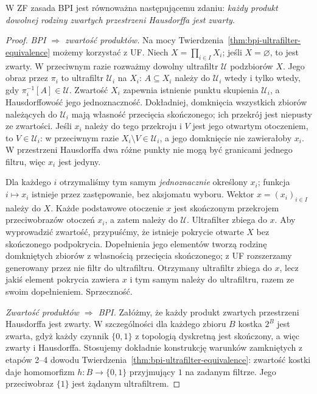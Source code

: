 \begin{twierdzenie}
\label{thm:bpi-tychonoff-hausdorff}
W ZF zasada BPI jest równoważna następującemu zdaniu:
\emph{każdy produkt dowolnej rodziny zwartych przestrzeni
Hausdorffa jest zwarty}.
\end{twierdzenie}
\begin{proof}
\emph{BPI $\Rightarrow$ zwartość produktów.}
Na mocy Twierdzenia~\ref{thm:bpi-ultrafilter-equivalence}
możemy korzystać z UF. Niech
$X=\prod_{i\in I}X_i$; jeśli $X=\varnothing$, to jest
zwarty. W przeciwnym razie rozważmy dowolny ultrafiltr
$\mathcal U$ podzbiorów $X$. Jego obraz przez $\pi_i$
to ultrafiltr $\mathcal U_i$ na $X_i$:
$A\subseteq X_i$ należy do $\mathcal U_i$
wtedy i tylko wtedy, gdy $\pi_i^{-1}[A]\in\mathcal U$.
Zwartość $X_i$ zapewnia istnienie punktu skupienia
$\mathcal U_i$, a Hausdorffowość jego jednoznaczność.
Dokładniej, domknięcia wszystkich zbiorów należących
do $\mathcal U_i$ mają własność przecięcia skończonego;
ich przekrój jest niepusty ze zwartości. Jeśli $x_i$
należy do tego przekroju i $V$ jest jego otwartym
otoczeniem, to $V\in\mathcal U_i$: w przeciwnym razie
$X_i\setminus V\in\mathcal U_i$, a jego domknięcie
nie zawierałoby $x_i$. W przestrzeni Hausdorffa dwa
różne punkty nie mogą być granicami jednego filtru,
więc $x_i$ jest jedyny.

Dla każdego $i$ otrzymaliśmy tym samym \emph{jednoznacznie}
określony $x_i$; funkcja $i\mapsto x_i$ istnieje
przez zastępowanie, bez aksjomatu wyboru. Wektor
$x=(x_i)_{i\in I}$ należy do $X$.
Każde podstawowe otoczenie $x$ jest skończonym
przekrojem przeciwobrazów otoczeń $x_i$, a zatem
należy do $\mathcal U$. Ultrafilter zbiega do $x$.
Aby wyprowadzić zwartość, przypuśćmy, że istnieje
pokrycie otwarte $X$ bez skończonego podpokrycia.
Dopełnienia jego elementów tworzą rodzinę domkniętych
zbiorów z własnością przecięcia skończonego; z UF
rozszerzamy generowany przez nie filtr do ultrafiltru.
Otrzymany ultrafiltr zbiega do $x$, lecz jakiś element
pokrycia zawiera $x$ i tym samym należy do ultrafiltru,
razem ze swoim dopełnieniem. Sprzeczność.

\emph{Zwartość produktów $\Rightarrow$ BPI.}
Załóżmy, że każdy produkt zwartych przestrzeni
Hausdorffa jest zwarty. W szczególności dla każdego
zbioru $B$ kostka $2^B$ jest zwarta, gdyż każdy czynnik
$\{0,1\}$ z topologią dyskretną jest skończony,
a więc zwarty i Hausdorffa. Stosujemy dokładnie
konstrukcję warunków zamkniętych z etapów 2--4
dowodu Twierdzenia~\ref{thm:bpi-ultrafilter-equivalence}:
zwartość kostki daje homomorfizm $h:B\to\{0,1\}$
przyjmujący $1$ na zadanym filtrze. Jego przeciwobraz
$\{1\}$ jest żądanym ultrafiltrem.
\end{proof}

